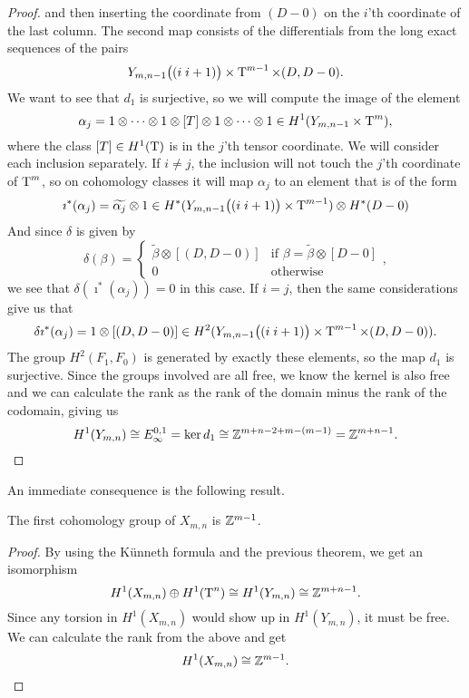 \begin{proof}
  and then inserting the coordinate from $(D-0)$ on the $i$'th
  coordinate of the last column.
  The second map consists of the differentials from the long exact
  sequences of the pairs
  \[ Y_{m,n-1}\big((i\; i+1)\big) \times \operatorname{T}^{m-1}\times (D,D-0). \]
  We want to see that $d_1$ is surjective, so we will compute the
  image of the element 
  \[ \alpha_j = 1\otimes\dots\otimes 1\otimes [T] \otimes 1 \otimes
  \dots
  \otimes 1 \in H^1(Y_{m,n-1}\times \operatorname{T}^{m}),\] 
  where the class $[T]\in H^1(\operatorname{T})$ is in the $j$'th tensor coordinate.
  We will consider each inclusion separately. If $i \neq j$, the
  inclusion will not touch the $j$'th coordinate of $\operatorname{T}^m$, so on
  cohomology classes it will map $\alpha_j$ to an element that is of
  the form
  \[ \imath^*(\alpha_j) = \widetilde{\alpha_j}\otimes 1 \in
  H^*(Y_{m,n-1}\big((i\; i+1) \big) \times \operatorname{T}^{m-1}) \otimes
  H^*(D-0) \]
  And since $\delta$ is given by 
  \[ \delta(\beta) =
  \begin{cases}
    \widetilde{\beta}\otimes [(D,D-0)] & \text{if } \beta =
    \widetilde{\beta}\otimes [D-0] \\
    0 & \text{otherwise}
  \end{cases}, \]
  we see that $\delta(\imath^*(\alpha_j)) = 0$ in this case. If $i =
  j$, then the same considerations give us that
  \[ \delta\imath^*(\alpha_j) = 1 \otimes [(D,D-0)] \in
  H^2(Y_{m,n-1}\big((i\; i+1) \big) \times \operatorname{T}^{m-1}\times (D,D-0)). \]
  The group $H^2(F_1,F_0)$ is generated by exactly these elements, so
  the map $d_1$ is surjective. Since the groups involved are all free,
  we know the kernel is also free and we can calculate the rank as the
  rank of the domain minus the rank of the codomain, giving us
  \[ H^1(Y_{m,n}) \cong E_{\infty}^{0,1} = \ker d_1 \cong
  \mathbb{Z}^{m+n-2+m-(m-1)} = \mathbb{Z}^{m+n-1}. \]
\end{proof}

An immediate consequence is the following result.

\begin{corollary}
  The first cohomology group of $X_{m,n}$ is $\mathbb{Z}^{m-1}$.
\end{corollary}
\begin{proof}
  By using the K\"unneth formula and the previous theorem, we get an
  isomorphism
  \[ H^1(X_{m,n}) \oplus H^1(\operatorname{T}^n) \cong  H^1(Y_{m,n}) \cong
  \mathbb{Z}^{m+n-1}. \]
  Since any torsion in $H^1(X_{m,n})$ would show up in $H^1(Y_{m,n})$,
  it must be free. We can calculate the rank from the above and get
  \[ H^1(X_{m,n}) \cong \mathbb{Z}^{m-1}. \]
\end{proof}

